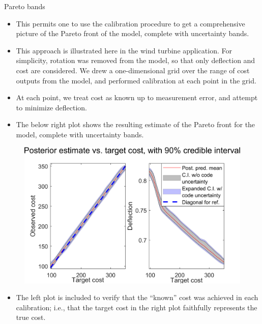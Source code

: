 \documentclass[final]{beamer}
\newlength{\onecolwid}
\begin{document}
\begin{frame}[t]
\begin{columns}[t]
\begin{column}{\onecolwid}
\begin{alertblock}{Pareto bands}
\begin{itemize}
\item This permits one to use the calibration procedure to get a comprehensive picture of the Pareto front of the model, complete with uncertainty bands.

\item This approach is illustrated here in the wind turbine application. For simplicity, rotation was removed from the model, so that only deflection and cost are considered. We drew a one-dimensional grid over the range of cost outputs from the model, and performed calibration at each point in the grid. 

\item At each point, we treat cost as known up to measurement error, and attempt to minimize deflection.

\item The below right plot shows the resulting estimate of the Pareto front for the model, complete with uncertainty bands.
\end{itemize}

\begin{figure}[h!]
\includegraphics[width=\linewidth]{FIG_cost_grid_pareto_bands}
\label{blade}
\end{figure}

\vspace{-18mm}
\begin{itemize}
\item The left plot is included to verify that the ``known'' cost was achieved in each calibration; i.e., that the target cost in the right plot faithfully represents the true cost.


\end{itemize}




\end{alertblock}
\end{column}
\end{columns}
\end{frame}
\end{document}
